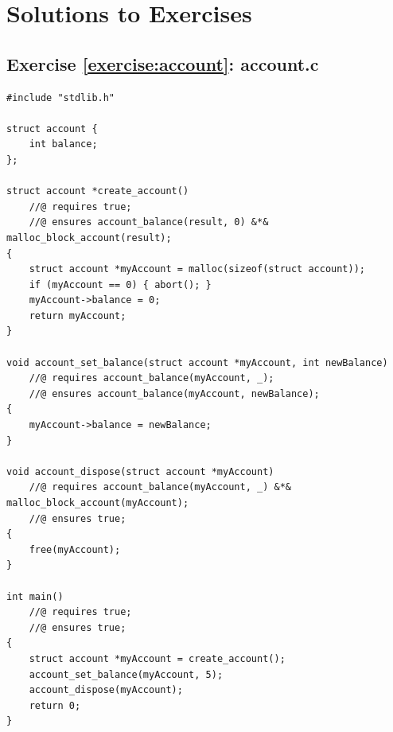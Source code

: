 \documentclass{article}
\begin{document}
%
%
%
%
%

\section{Solutions to Exercises}

\subsection{Exercise \ref{exercise:account}: account.c}

\begin{lstlisting}
#include "stdlib.h"

struct account {
    int balance;
};

struct account *create_account()
    //@ requires true;
    //@ ensures account_balance(result, 0) &*& malloc_block_account(result);
{
    struct account *myAccount = malloc(sizeof(struct account));
    if (myAccount == 0) { abort(); }
    myAccount->balance = 0;
    return myAccount;
}

void account_set_balance(struct account *myAccount, int newBalance)
    //@ requires account_balance(myAccount, _);
    //@ ensures account_balance(myAccount, newBalance);
{
    myAccount->balance = newBalance;
}

void account_dispose(struct account *myAccount)
    //@ requires account_balance(myAccount, _) &*& malloc_block_account(myAccount);
    //@ ensures true;
{
    free(myAccount);
}

int main()
    //@ requires true;
    //@ ensures true;
{
    struct account *myAccount = create_account();
    account_set_balance(myAccount, 5);
    account_dispose(myAccount);
    return 0;
}
\end{lstlisting}
\end{document}
